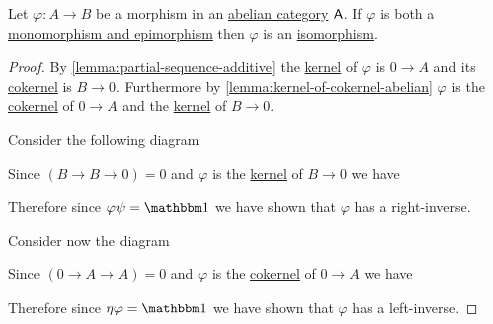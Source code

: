 \documentclass[../../../main]{subfiles}
\begin{document}
\begin{lemma} \label{lemma:mono-and-epi-is-iso}
  Let \(\varphi: A \to B\) be a morphism in an \hyperref[def:abelian-category]{abelian category} \(\mathsf{A}\).
  If \(\varphi\) is both a \hyperref[def:mono-epi-morphism]{monomorphism and epimorphism} then \(\varphi\) is an \hyperref[def:categorical-isomorphism]{isomorphism}.
\end{lemma}
\begin{proof}
  By \autoref{lemma:partial-sequence-additive} the \hyperref[def:categorical-kernel]{kernel} of \(\varphi\) is \(0 \to A\) and its \hyperref[def:categorical-cokernel]{cokernel} is \(B \to 0\).
  Furthermore by \autoref{lemma:kernel-of-cokernel-abelian} \(\varphi\) is the \hyperref[def:categorical-cokernel]{cokernel} of \(0 \to A\) and the \hyperref[def:categorical-kernel]{kernel} of \(B \to 0\).

  Consider the following diagram
  \begin{center}
  \end{center}
  Since \((B \to B \to 0) = 0\) and \(\varphi\) is the \hyperref[def:categorical-kernel]{kernel} of \(B \to 0\) we have
  \begin{center}
  \end{center}
  Therefore since \(\varphi \psi = \id\) we have shown that \(\varphi\) has a right-inverse.

  Consider now the diagram
  \begin{center}
  \end{center}
  Since \((0 \to A \to A) = 0\) and \(\varphi\) is the \hyperref[def:categorical-cokernel]{cokernel} of \(0 \to A\) we have
  \begin{center}
  \end{center}
  Therefore since \(\eta \varphi = \id\) we have shown that \(\varphi\) has a left-inverse.
\end{proof}
\end{document}
